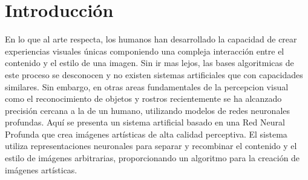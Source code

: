 \documentclass[a4paper,11pt,spanish]{book}
\begin{document}
    \section{Introducción}
      En lo que al arte respecta, los humanos han desarrollado la capacidad de crear experiencias visuales únicas componiendo una compleja interacción entre el contenido y el estilo de una imagen.
      Sin ir mas lejos, las bases algoritmicas de este proceso se desconocen y no existen sistemas artificiales que con capacidades similares. Sin embargo, en otras areas fundamentales
      de la percepcion visual como el reconocimiento de objetos y rostros recientemente se ha alcanzado precisión cercana a la de un humano, utilizando modelos de redes neuronales profundas.
      Aquí se presenta un sistema artificial basado en una Red Neural Profunda que crea imágenes artísticas de alta calidad perceptiva. El sistema utiliza representaciones neuronales
      para separar y recombinar el contenido y el estilo de imágenes arbitrarias, proporcionando un algoritmo para la creación de imágenes artísticas.
\end{document}
